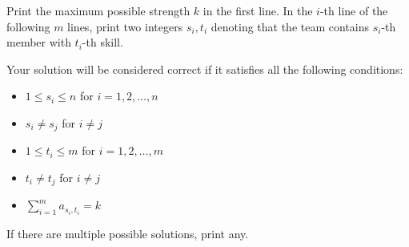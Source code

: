 Print the maximum possible strength $k$ in the first line.
In the $i$-th line of the following $m$ lines, print two integers $s_i,t_i$ denoting that the team contains $s_i$-th member with $t_i$-th skill.

Your solution will be considered correct if it satisfies all the following conditions:
\begin{itemize}
    \item $1 \leq s_i \leq n$ for $i = 1,2,\ldots,n$
    \item $s_i \neq s_j$ for $i \neq j$
    \item $1 \leq t_i \leq m$ for $i = 1,2,\ldots,m$
    \item $t_i \neq t_j$ for $i \neq j$
    \item $\displaystyle \sum_{i=1}^{m} a_{s_i,t_i} = k$
\end{itemize}
If there are multiple possible solutions, print any.